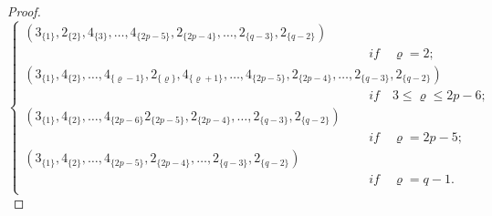 \documentclass[]{interact}
\theoremstyle{plain}%
\theoremstyle{definition}
\theoremstyle{remark}
\begin{document}
\begin{proof}
\begin{equation*}
\begin{cases}
                    (3_{\{1\}},2_{\{2\}},4_{\{3\}}, \ldots, 4_{\{2p-5 \}},2_{\{2p-4 \}}, \ldots,2_{\{q-3\}},2_{\{q-2\}}) 
                    \\
\qquad \qquad \qquad \qquad \qquad \qquad \qquad \qquad \qquad  \qquad \qquad\qquad\qquad\quad\textit{if}\quad\varrho= 2;\\ 
                   (3_{\{1\}},4_{\{2\}}, \ldots,4_{\{\varrho-1\}},2_{\{ \varrho\}},4_{\{\varrho +1\}}, \ldots, 4_{\{2p-5 \}},2_{\{2p-4 \}}, \ldots,2_{\{q-3\}},2_{\{q-2\}})\\
\qquad \qquad \qquad \qquad \qquad \qquad \qquad \qquad \qquad  \qquad \qquad\qquad\qquad\quad\textit{if}\quad   3 \leq  \varrho  \leq 2p-6  ;\\
                      (3_{\{1\}},4_{\{2\}}, \ldots, 4_{\{2p-6 \}} 2_{\{2p-5 \}},2_{\{2p-4 \}}, \ldots,2_{\{q-3\}},2_{\{q-2\}})\\
\qquad \qquad \qquad \qquad \qquad \qquad \qquad \qquad \qquad  \qquad \qquad\qquad\qquad\quad\textit{if}\quad   \varrho= 2p-5;\\
                    (3_{\{1\}},4_{\{2\}}, \ldots, 4_{\{2p-5\}},2_{\{2p-4\}}, \ldots,2_{\{q-3\}},2_{\{q-2\}})\\ \qquad \qquad \qquad \qquad \qquad \qquad \qquad \qquad \qquad  \qquad \qquad\qquad\qquad\quad\textit{if}\quad\varrho= q-1.\\
                     \end{cases}
                    \end{equation*}


\end{proof}
\end{document}
